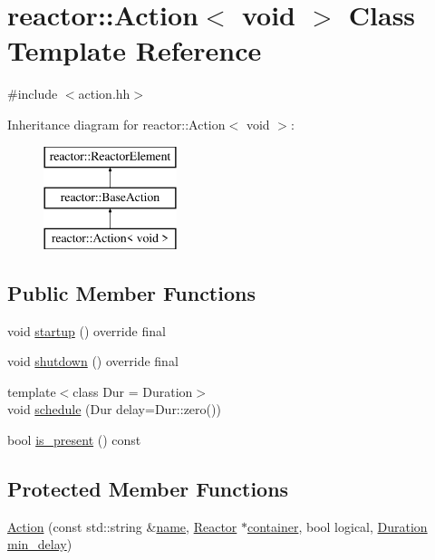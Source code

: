 \hypertarget{classreactor_1_1Action_3_01void_01_4}{}\section{reactor\+:\+:Action$<$ void $>$ Class Template Reference}
\label{classreactor_1_1Action_3_01void_01_4}


{\ttfamily \#include $<$action.\+hh$>$}

Inheritance diagram for reactor\+:\+:Action$<$ void $>$\+:\begin{figure}[H]
\begin{center}
\leavevmode
\includegraphics[height=3.000000cm]{classreactor_1_1Action_3_01void_01_4}
\end{center}
\end{figure}
\subsection*{Public Member Functions}
\begin{DoxyCompactItemize}
\item 
void \hyperlink{classreactor_1_1Action_3_01void_01_4_a6ba1aa14251401ebb7a4b13624d5ce92}{startup} () override final
\item 
void \hyperlink{classreactor_1_1Action_3_01void_01_4_a871645e568af7688eeacefbb65be4489}{shutdown} () override final
\item 
{\footnotesize template$<$class Dur  = Duration$>$ }\\void \hyperlink{classreactor_1_1Action_3_01void_01_4_aefb6d085020d1a60edbda6dce5dc033c}{schedule} (Dur delay=Dur\+::zero())
\item 
bool \hyperlink{classreactor_1_1Action_3_01void_01_4_a073662b60fddaebe09bba20082738120}{is\+\_\+present} () const
\end{DoxyCompactItemize}
\subsection*{Protected Member Functions}
\begin{DoxyCompactItemize}
\item 
\hyperlink{classreactor_1_1Action_3_01void_01_4_a74b23c4d882b046dc8e9aaad11e10eab}{Action} (const std\+::string \&\hyperlink{classreactor_1_1ReactorElement_a99579f61dbaf5d5d98aebfe26eb8bf77}{name}, \hyperlink{classreactor_1_1Reactor}{Reactor} $\ast$\hyperlink{classreactor_1_1ReactorElement_a25bf298de879a82eefc1ba426be05812}{container}, bool logical, \hyperlink{namespacereactor_aa8375b807a80703545664096c5b5b779}{Duration} \hyperlink{classreactor_1_1BaseAction_a98201db474f34cb9e38151a6960128f0}{min\+\_\+delay})
\end{DoxyCompactItemize}
